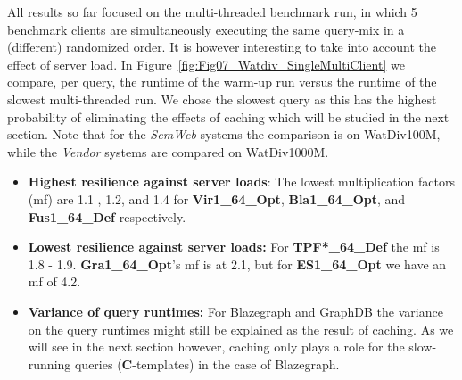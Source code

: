 
%
All results so far focused on the multi-threaded benchmark run, in which 5 benchmark clients are simultaneously executing the same query-mix in a (different) randomized order. It is however interesting to take into account the effect of server load. In Figure~\ref{fig:Fig07_Watdiv_SingleMultiClient} we compare, per query, the runtime of the warm-up run versus the runtime of the slowest multi-threaded run. We chose the slowest query as this has the highest probability of eliminating the effects of caching which will be studied in the next section. Note that for the \emph{SemWeb} systems the comparison is on WatDiv100M, while the \emph{Vendor} systems are compared on WatDiv1000M.


\begin{itemize}
	\item \textbf{Highest resilience against server loads}: The lowest multiplication factors (mf) are 1.1 , 1.2, and 1.4 for \textbf{Vir1\_64\_Opt}, \textbf{Bla1\_64\_Opt}, and \textbf{Fus1\_64\_Def} respectively. 
	 
	\item \textbf{Lowest resilience against server loads:} For \textbf{TPF*\_64\_Def} the mf is 1.8 - 1.9.  \textbf{Gra1\_64\_Opt}'s mf is at 2.1, but for \textbf{ES1\_64\_Opt} we have an mf of 4.2.
	
	\item \textbf{Variance of query runtimes:} For Blazegraph and GraphDB the variance on the query runtimes might still be explained as the result of caching. As we will see in the next section however, caching only plays a role for the slow-running queries (\textbf{C}-templates) in the case of Blazegraph.
\end{itemize}
